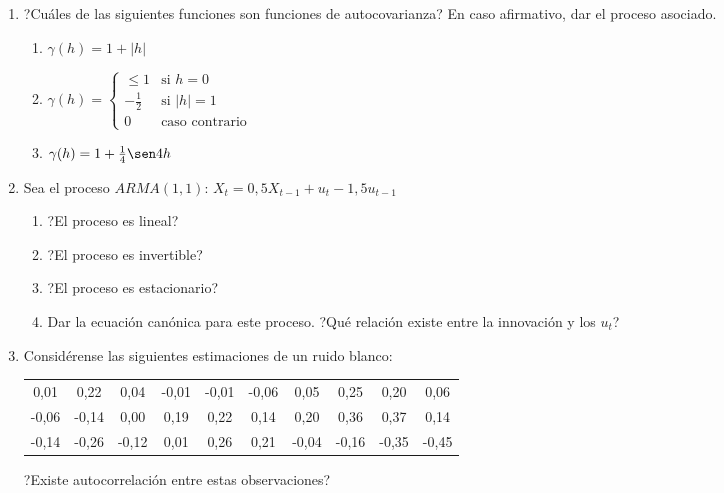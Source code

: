 \begin{enumerate}[resume]
\item ?Cu\'{a}les de las siguientes funciones son funciones de autocovarianza? En caso afirmativo, dar el proceso asociado.
	\begin{enumerate}
	\item $\gamma (h)=1+\left| h \right|$
	\item $\gamma (h)=\begin{cases}\le
	                   1 &\text{si } h=0\\
	                   -\frac{1}{2} &\text{si } \left| h \right|=1 \\
	                   0 &\text{caso contrario}
	                  \end{cases}$
	\item $\gamma (h)=1+\frac{1}{4}\sen 4h$
	\end{enumerate}
\item Sea el proceso $ARMA (1, 1)$: $X_{t}=0,5X_{t-1} +u_{t} -1,5  u_{t-1} $
	\begin{enumerate}
	\item ?El proceso es lineal?
	\item ?El proceso es invertible?
	\item ?El proceso es estacionario?
	\item Dar la ecuaci\'{o}n can\'{o}nica para este proceso. ?Qu\'{e} relaci\'{o}n existe entre la innovaci\'{o}n y los $u_{{t}}$?
	\end{enumerate}
\item Consid\'{e}rense las siguientes estimaciones de un ruido blanco:
\begin{center}
 \begin{tabular}{cccccccccc}
0,01& 0,22& 0,04& -0,01& -0,01& -0,06& 0,05& 0,25& 0,20& 0,06 \\
-0,06& -0,14& 0,00& 0,19& 0,22& 0,14& 0,20& 0,36& 0,37& 0,14 \\
-0,14& -0,26& -0,12& 0,01& 0,26& 0,21& -0,04& -0,16& -0,35& -0,45
\end{tabular}
\end{center}


?Existe autocorrelaci\'{o}n entre estas observaciones?
\end{enumerate}
